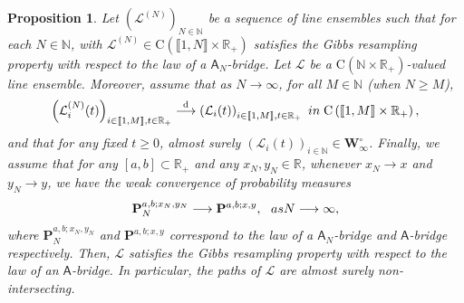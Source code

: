 \documentclass[10pt,a4paper]{amsart}
\newtheorem{prop}{Proposition}
\begin{document}
\begin{prop}\label{PropositionLimitingGibbs}
Let $(\mathcal{L}^{(N)})_{N\in\mathbb{N}} $ be a sequence of line ensembles such that for each $N\in\mathbb{N}$, with $\mathcal{L}^{(N)}\in \mathrm{C}(\llbracket 1, N \rrbracket \times \mathbb{R}_+)$  satisfies the Gibbs resampling property with respect to the law of a $\mathsf{A}_N$-bridge. Let $\mathcal{L}$ be a $\mathrm{C}(\mathbb{N}\times\mathbb{R}_+)$-valued line ensemble. Moreover, assume that as $N \longrightarrow \infty$, for all $M \in \mathbb{N}$ (when $N\ge M$),
\begin{align*} \left(\mathcal{L}^{(N)}_{i}(t)\right)_{i\in \llbracket 1, M \rrbracket, t\in \mathbb{R}_+}\overset{\mathrm{d}}{\longrightarrow}\left(\mathcal{L}_{i}(t)\right)_{i\in \llbracket 1, M \rrbracket, t\in \mathbb{R}_+} \ \textnormal{ in }\; \mathrm{C}\left(\llbracket 1, M \rrbracket \times\mathbb{R}_+\right), 
\end{align*}
and that for any fixed $t\ge 0$, almost surely $(\mathcal{L}_i(t))_{i\in \mathbb{N}}\in \mathbf{W}_\infty^\circ$. Finally, we assume that for any $[a,b]\subset \mathbb{R}_+$ and any $x_N,y_N \in \mathbb{R}$, whenever $x_N \to x$ and $y_N \to y$, we have the weak convergence of probability measures
\begin{equation*}
\mathbf{P}_N^{a,b;x_N,y_N} \longrightarrow\mathbf{P}^{a,b;x,y}, \ \ \textnormal{ as } N \longrightarrow\infty,
\end{equation*}
where $\mathbf{P}_N^{a,b;x_N,y_N}$ and $\mathbf{P}^{a,b;x,y}$ correspond to the law of a $\mathsf{A}_N$-bridge and $\mathsf{A}$-bridge respectively. Then, $\mathcal{L}$ satisfies the Gibbs resampling property with respect to the law of an $\mathsf{A}$-bridge.
In particular, the paths of $\mathcal{L}$ are almost surely non-intersecting.
\end{prop}
\end{document}
